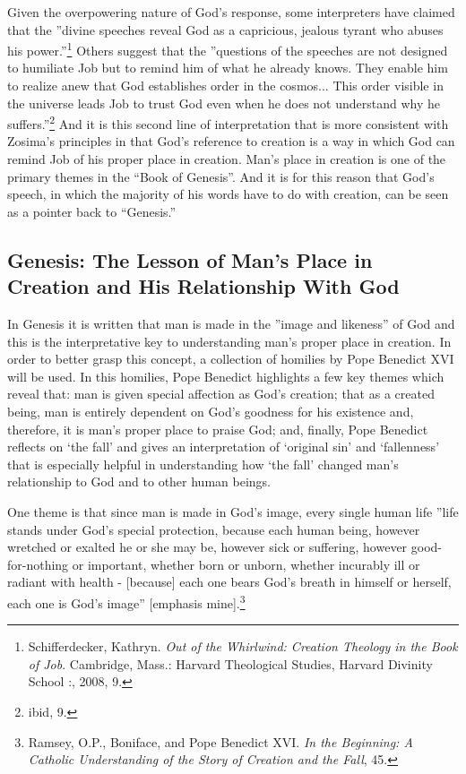 Given the overpowering nature of God's response, some interpreters have claimed that the ''divine speeches reveal God as a capricious, jealous tyrant who abuses his power.''\footnote{Schifferdecker, Kathryn. \emph{Out of the Whirlwind: Creation Theology in the Book of Job}. Cambridge, Mass.: Harvard Theological Studies, Harvard Divinity School :, 2008, 9.} Others suggest that the ''questions of the speeches are not designed to humiliate Job but to remind him of what he already knows. They enable him to realize anew that God establishes order in the cosmos... This order visible in the universe leads Job to trust God even when he does not understand why he suffers.''\footnote{ibid, 9.} And it is this second line of interpretation that is more consistent with Zosima's principles in that God's reference to creation is a way in which God can remind Job of his proper place in creation. Man's place in creation is one of the primary themes in the ``Book of Genesis''. And it is for this reason that God's speech, in which the majority of his words have to do with creation, can be seen as a pointer back to ``Genesis.''

\subsection{Genesis: The Lesson of Man's Place in Creation and His Relationship With God}
In Genesis it is written that man is made in the ''image and likeness'' of God and this is the interpretative key to understanding man's proper place in creation. In order to better grasp this concept, a collection of homilies by Pope Benedict XVI will be used. In this homilies, Pope Benedict highlights a few key themes which reveal that: man is given special affection as God's creation; that as a created being, man is entirely dependent on God's goodness for his existence and, therefore, it is man's proper place to praise God; and, finally, Pope Benedict reflects on `the fall' and gives an interpretation of `original sin' and `fallenness' that is especially helpful in understanding how `the fall' changed man's relationship to God and to other human beings. 

One theme is that since man is made in God's image, every single human life ''life stands under God's special protection, because each human being, however wretched or exalted he or she may be, however sick or suffering, however good-for-nothing or important, whether born or unborn, whether incurably ill or radiant with health - [because] each one bears God's breath in himself or herself, each one is God's image'' [emphasis mine].\footnote{Ramsey, O.P., Boniface, and Pope Benedict XVI. \emph{In the Beginning: A Catholic Understanding of the Story of Creation and the Fall}, 45.} 

